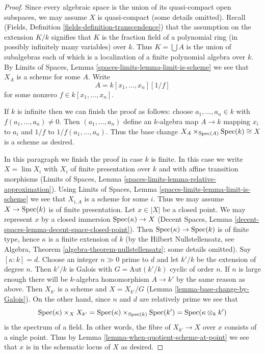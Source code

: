 \begin{proof}
Since every algebraic space is the union of its quasi-compact open
subspaces, we may assume $X$ is quasi-compact (some details omitted).
Recall (Fields, Definition \ref{fields-definition-transcendence})
that the assumption on the extension $K/k$ signifies that
$K$ is the fraction field of a polynomial ring (in possibly infinitely
many variables) over $k$. Thus $K = \bigcup A$ is the union of subalgebras
each of which is a localization of a finite polynomial algebra over $k$.
By Limits of Spaces, Lemma \ref{spaces-limits-lemma-limit-is-scheme}
we see that $X_A$ is a scheme for some $A$. Write
$$
A = k[x_1, \ldots, x_n][1/f]
$$
for some nonzero $f \in k[x_1, \ldots, x_n]$.

\medskip\noindent
If $k$ is infinite then we can finish the proof as follows: choose
$a_1, \ldots, a_n \in k$ with $f(a_1, \ldots, a_n) \not = 0$.
Then $(a_1, \ldots, a_n)$ define an $k$-algebra map $A \to k$
mapping $x_i$ to $a_i$ and $1/f$ to $1/f(a_1, \ldots, a_n)$.
Thus the base change $X_A \times_{\mathop{\mathrm{Spec}}(A)} \mathop{\mathrm{Spec}}(k) \cong X$ is a
scheme as desired.

\medskip\noindent
In this paragraph we finish the proof in case $k$ is finite. In this
case we write $X = \lim X_i$ with $X_i$ of finite presentation over $k$
and with affine transition morphisms
(Limits of Spaces, Lemma \ref{spaces-limits-lemma-relative-approximation}).
Using Limits of Spaces, Lemma \ref{spaces-limits-lemma-limit-is-scheme}
we see that $X_{i, A}$ is a scheme for some $i$. Thus we may assume
$X \to \mathop{\mathrm{Spec}}(k)$ is of finite presentation. Let $x \in |X|$ be a closed
point. We may represent $x$ by a closed immersion
$\mathop{\mathrm{Spec}}(\kappa) \to X$
(Decent Spaces, Lemma \ref{decent-spaces-lemma-decent-space-closed-point}).
Then $\mathop{\mathrm{Spec}}(\kappa) \to \mathop{\mathrm{Spec}}(k)$ is of finite type, hence $\kappa$
is a finite extension of $k$ (by the Hilbert Nullstellensatz, see
Algebra, Theorem \ref{algebra-theorem-nullstellensatz};
some details omitted). Say $[\kappa : k] = d$. Choose an integer
$n \gg 0$ prime to $d$ and let $k'/k$ be the extension
of degree $n$. Then $k'/k$ is Galois with $G = \text{Aut}(k'/k)$
cyclic of order $n$. If $n$ is large enough there will be $k$-algebra
homomorphism $A \to k'$ by the same reason as above.
Then $X_{k'}$ is a scheme and $X = X_{k'}/G$
(Lemma \ref{lemma-base-change-by-Galois}).
On the other hand, since $n$ and $d$ are relatively prime we see that
$$
\mathop{\mathrm{Spec}}(\kappa) \times_{X} X_{k'} =
\mathop{\mathrm{Spec}}(\kappa) \times_{\mathop{\mathrm{Spec}}(k)} \mathop{\mathrm{Spec}}(k') =
\mathop{\mathrm{Spec}}(\kappa \otimes_k k')
$$
is the spectrum of a field. In other words, the fibre of $X_{k'} \to X$
over $x$ consists of a single point. Thus by
Lemma \ref{lemma-when-quotient-scheme-at-point}
we see that $x$ is in the schematic locus of $X$ as desired.
\end{proof}

